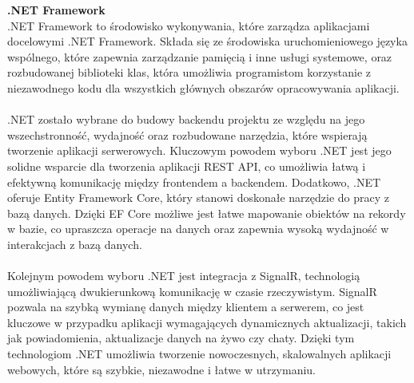 \documentclass[12pt,a4paper]{article}
\begin{document}
\noindent \textbf{.NET Framework}\\
.NET Framework to środowisko wykonywania, które zarządza aplikacjami docelowymi .NET Framework. Składa się ze środowiska uruchomieniowego języka wspólnego, które zapewnia zarządzanie pamięcią i inne usługi systemowe, oraz rozbudowanej biblioteki klas, która umożliwia programistom korzystanie z niezawodnego kodu dla wszystkich głównych obszarów opracowywania aplikacji.
\\\\
.NET zostało wybrane do budowy backendu projektu ze względu na jego wszechstronność, wydajność oraz rozbudowane narzędzia, które wspierają tworzenie aplikacji serwerowych. Kluczowym powodem wyboru .NET jest jego solidne wsparcie dla tworzenia aplikacji REST API, co umożliwia łatwą i efektywną komunikację między frontendem a backendem. Dodatkowo, .NET oferuje Entity Framework Core, który stanowi doskonałe narzędzie do pracy z bazą danych. Dzięki EF Core możliwe jest łatwe mapowanie obiektów na rekordy w bazie, co upraszcza operacje na danych oraz zapewnia wysoką wydajność w interakcjach z bazą danych.
\\\\
Kolejnym powodem wyboru .NET jest integracja z SignalR, technologią umożliwiającą dwukierunkową komunikację w czasie rzeczywistym. SignalR pozwala na szybką wymianę danych między klientem a serwerem, co jest kluczowe w przypadku aplikacji wymagających dynamicznych aktualizacji, takich jak powiadomienia, aktualizacje danych na żywo czy chaty. Dzięki tym technologiom .NET umożliwia tworzenie nowoczesnych, skalowalnych aplikacji webowych, które są szybkie, niezawodne i łatwe w utrzymaniu.
\\\\
\end{document}
